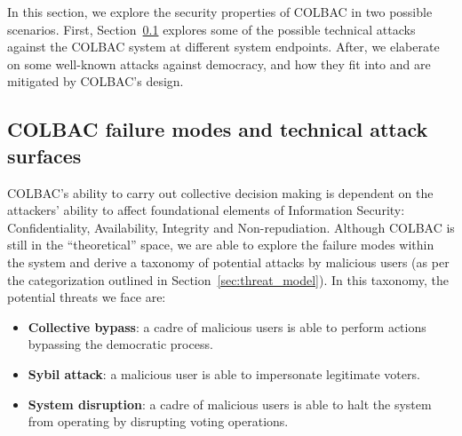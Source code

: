 In this section, we explore the security properties of COLBAC in two possible
scenarios.  First, Section~\ref{sec:technical} explores some of the possible
technical attacks against the COLBAC system at different system endpoints.
After, we elaberate on some well-known attacks against democracy, and how they
fit into and are mitigated by COLBAC's design.


\subsection{COLBAC failure modes and technical attack surfaces}
\label{sec:technical}
COLBAC's ability to carry out collective decision making is dependent on the
attackers' ability to affect foundational elements of Information Security:
Confidentiality, Availability, Integrity and Non-repudiation. Although COLBAC
is still in the ``theoretical'' space, we are able to explore the failure modes
within the system and derive a taxonomy of potential attacks by malicious users
(as per the categorization outlined in Section~\ref{sec:threat_model}). In this
taxonomy, the potential threats we face are:

\begin{itemize}
    \item {\bf Collective bypass}: a cadre of malicious users is able
        to perform actions bypassing the democratic process.

    \item {\bf Sybil attack}: a malicious user is able
        to impersonate legitimate voters.

    \item {\bf System disruption}: a cadre of malicious users is able to halt
        the system from operating by disrupting voting operations.

\end{itemize}

